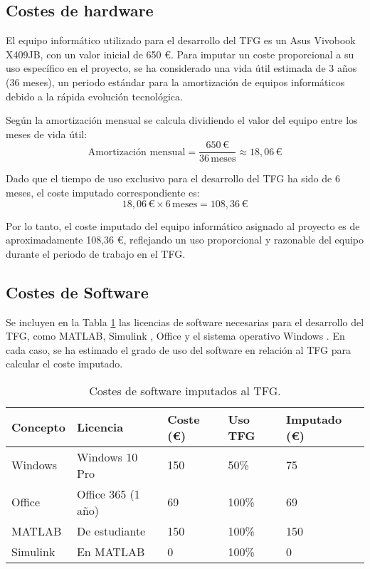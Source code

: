\subsection{Costes de hardware}
El equipo informático utilizado para el desarrollo del TFG es un Asus Vivobook X409JB, con un valor inicial de 650 €. Para imputar un coste proporcional a su uso específico en el proyecto, se ha considerado una vida útil estimada de 3 años (36 meses), un periodo estándar para la amortización de equipos informáticos debido a la rápida evolución tecnológica.

Según \cite{minhacienda_amortizacion} la amortización mensual se calcula dividiendo el valor del equipo entre los meses de vida útil:
\[
\text{Amortización mensual} = \frac{650\,\text{€}}{36\, \text{meses}} \approx 18{,}06\,\text{€}
\]

Dado que el tiempo de uso exclusivo para el desarrollo del TFG ha sido de 6 meses, el coste imputado correspondiente es:
\[
18{,}06\,\text{€} \times 6\, \text{meses} = 108{,}36\,\text{€}
\]

Por lo tanto, el coste imputado del equipo informático asignado al proyecto es de aproximadamente 108,36 €, reflejando un uso proporcional y razonable del equipo durante el periodo de trabajo en el TFG.





\subsection{Costes de Software}
Se incluyen en la Tabla \ref{software} las licencias de software necesarias para el desarrollo del TFG, como MATLAB, Simulink \cite{mathworks_matlab_student}, Office \cite{microsoft_windows11_get}  y el sistema operativo Windows \cite{microsoft365personal}. En cada caso, se ha estimado el grado de uso del software en relación al TFG para calcular el coste imputado.
\begin{table}[H]
\centering
\small
\begin{tabular}{|p{2cm}|p{3cm}|p{2cm}|p{2cm}|p{2cm}|}
\hline
\textbf{Concepto} & \textbf{Licencia} & \textbf{Coste (€)} & \textbf{Uso TFG} & \textbf{Imputado (€)} \\
\hline
Windows & Windows 10 Pro & 150 & 50\% & 75 \\
Office & Office 365 (1 año)  & 69 & 100\% & 69 \\
MATLAB &  De estudiante  & 150 & 100\% & 150 \\
Simulink &  En MATLAB & 0 & 100\% & 0 \\
\hline
\end{tabular}
\caption{Costes de software imputados al TFG.}
\label{software}
\end{table}

